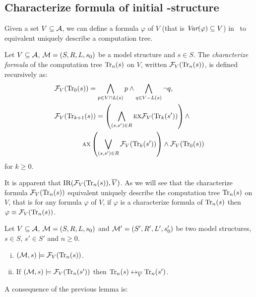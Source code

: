 \documentclass{article}
\begin{document}
\subsection{Characterize formula of initial \MPK-structure}
Given a set $V\subseteq{\cal A}$, we can define a formula $\varphi$ of $V$ (that is $\textit{Var}(\varphi) \subseteq V$) in \CTL\ to equivalent uniquely describe a computation tree.
\begin{definition}\label{def:V:char:formula}
Let $V\subseteq {\cal A}$, ${\cal M} =(S,R,L,s_0)$ be a model structure and $s\in S$.
The {\em characterize formula} of the computation tree $\textrm{Tr}_n(s)$ on $V$,
written ${\cal F}_V(\textrm{Tr}_n(s))$, is defined recursively as:
\begin{align*}
  & {\cal F}_V(\textrm{Tr}_0(s)) = \bigwedge_{p \in V\cap L(s)}p
     \wedge \bigwedge_{q\in V-L(s)} \neg q,\\
  & {\cal F}_V(\textrm{Tr}_{k+1}(s)) = \left(\bigwedge_{(s,s')\in R}
    \textsc{e} \textsc{x} {\cal F}_V(\textrm{Tr}_k(s'))\right)
    \wedge \\
  & \qquad \qquad \textsc{a} \textsc{x}\left(\bigvee_{(s,s')\in R}
    {\cal F}_V(\textrm{Tr}_k(s') )\right)
    \wedge {\cal F}_V(\textrm{Tr}_0(s))
\end{align*}
for $k\ge 0$.
\end{definition}
It is apparent that $\textrm{IR}({\cal F}_V(\textrm{Tr}_n(s)), \overline V)$.
As we will see that the characterize formula ${\cal F}_V(\textrm{Tr}_n(s))$ equivalent uniquely describe the computation tree $\textrm{Tr}_n(s)$ on $V$, that is for any formula $\varphi$ of $V$, if $\varphi$ is a characterize formula of $\textrm{Tr}_n(s)$ then $\varphi \equiv {\cal F}_V(\textrm{Tr}_n(s))$.


\begin{lemma}\label{Bn:to:Tn}
Let $V\subseteq {\cal A}$, ${\cal M}=(S, R, L,s_0)$ and ${\cal M}'=(S', R', L',s_0')$ be two model structures,
$s\in S$, $s'\in S'$ and $n\ge 0$.
\begin{enumerate}[(i)]
  \item $({\cal M},s)\models{\cal F}_V(\textrm{Tr}_n(s))$.
  \item If $({\cal M},s)\models{\cal F}_V(\textrm{Tr}_n(s'))$ then
  $\textrm{Tr}_n(s) \leftrightarrow_{\overline V} \textrm{Tr}_n(s')$.
\end{enumerate}
\end{lemma}


A consequence of the previous lemma is:
\end{document}
